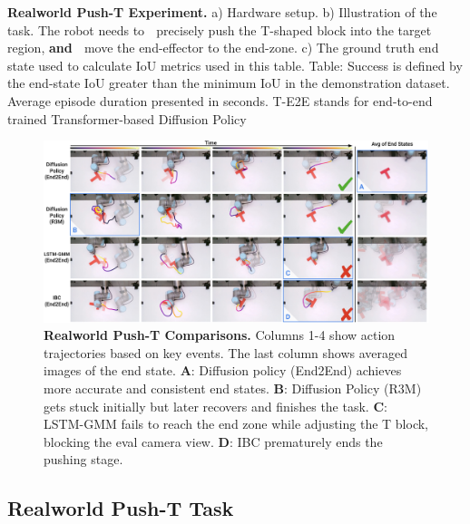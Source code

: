 \documentclass[Afour,sageh,times]{sagej}
\begin{document}
\begin{table}[t]
\caption{\textbf{Realworld Push-T Experiment.}
\label{tab:real_pusht}
a) Hardware setup.
b) Illustration of the task. The robot needs to \textcircled{} precisely push the T-shaped block into the target region, \textbf{and} \textcircled{} move the end-effector to the end-zone.
c) The ground truth end state used to calculate IoU metrics used in this table. Table: Success is defined by the end-state IoU greater than the minimum IoU in the demonstration dataset. Average episode duration presented in seconds. T-E2E stands for end-to-end trained Transformer-based Diffusion Policy}

\vspace{-4mm}
\end{table}

\begin{figure}
\centering
\includegraphics[width=\linewidth]{figure/real_results.pdf}

\caption{\textbf{Realworld Push-T Comparisons.}
\label{fig:real_pusht_comparison}
Columns 1-4 show action trajectories based on key events. The last column shows averaged images of the end state.
\textbf{A}: Diffusion policy (End2End) achieves more accurate and consistent end states.
\textbf{B}: Diffusion Policy (R3M) gets stuck initially but later recovers and finishes the task.
\textbf{C}: LSTM-GMM fails to reach the end zone while adjusting the T block, blocking the eval camera view.
\textbf{D}: IBC prematurely ends the pushing stage.
}
\vspace{-2mm}
\end{figure}

\subsection{Realworld Push-T Task}
\end{document}
